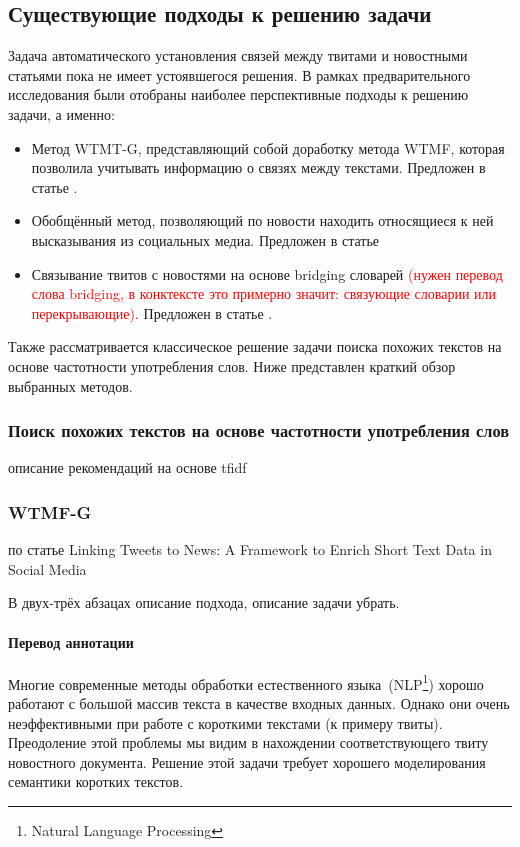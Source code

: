 \subsection{Существующие подходы к решению задачи}
    Задача автоматического установления связей между твитами и новостными статьями пока не имеет устоявшегося решения.
    В рамках предварительного исследования были отобраны наиболее перспективные подходы к решению задачи, а именно:
    \begin{itemize}
        \item Метод WTMT-G, представляющий собой доработку метода WTMF, которая позволила учитывать информацию о связях между текстами. Предложен в статье \cite{linking_base}.
        \item Обобщённый метод, позволяющий по новости находить относящиеся к ней высказывания из социальных медиа. Предложен в статье \cite{linking_news_media}
        \item Связывание твитов с новостями на основе bridging словарей \textcolor{red}{(нужен перевод слова bridging, в конктексте это примерно значит: связующие словарии или перекрывающие)}. Предложен в статье \cite{bridging}.
    \end{itemize}
    Также рассматривается классическое решение задачи поиска похожих текстов на основе частотности употребления слов.
    Ниже представлен краткий обзор выбранных методов.

    \subsubsection{Поиск похожих текстов на основе частотности употребления слов}
        описание рекомендаций на основе tfidf

    \subsubsection{WTMF-G}
        по статье Linking Tweets to News: A Framework to Enrich Short Text Data in Social Media

        В двух-трёх абзацах описание подхода, описание задачи убрать.

        \paragraph{Перевод аннотации}
            Многие современные методы обработки естественного языка~(NLP\footnote{Natural Language Processing}) хорошо работают с большой массив текста в качестве входных данных.
            Однако они очень неэффективными при работе с короткими текстами (к примеру твиты).
            Преодоление этой проблемы мы видим в нахождении соответствующего твиту новостного документа.
            Решение этой задачи требует хорошего моделирования семантики коротких текстов.

